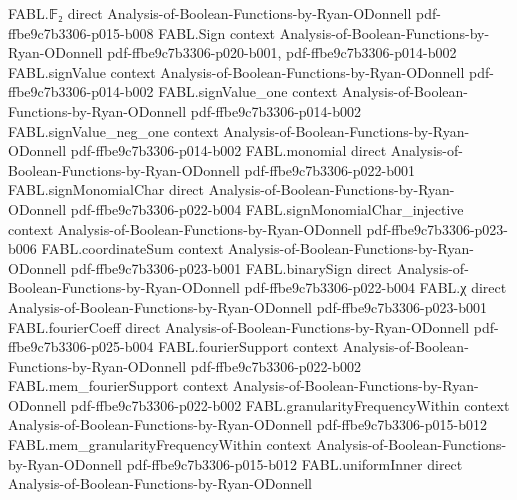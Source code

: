 \begin{theorem}
\leanok
{}
\proofstep
  {FABL.𝔽₂}
  {direct}
  {Analysis-of-Boolean-Functions-by-Ryan-ODonnell}
  {pdf-ffbe9c7b3306-p015-b008}
\proofstep
  {FABL.Sign}
  {context}
  {Analysis-of-Boolean-Functions-by-Ryan-ODonnell}
  {pdf-ffbe9c7b3306-p020-b001,
    pdf-ffbe9c7b3306-p014-b002}
\proofstep
  {FABL.signValue}
  {context}
  {Analysis-of-Boolean-Functions-by-Ryan-ODonnell}
  {pdf-ffbe9c7b3306-p014-b002}
\proofstep
  {FABL.signValue_one}
  {context}
  {Analysis-of-Boolean-Functions-by-Ryan-ODonnell}
  {pdf-ffbe9c7b3306-p014-b002}
\proofstep
  {FABL.signValue_neg_one}
  {context}
  {Analysis-of-Boolean-Functions-by-Ryan-ODonnell}
  {pdf-ffbe9c7b3306-p014-b002}
\proofstep
  {FABL.monomial}
  {direct}
  {Analysis-of-Boolean-Functions-by-Ryan-ODonnell}
  {pdf-ffbe9c7b3306-p022-b001}
\proofstep
  {FABL.signMonomialChar}
  {direct}
  {Analysis-of-Boolean-Functions-by-Ryan-ODonnell}
  {pdf-ffbe9c7b3306-p022-b004}
\proofstep
  {FABL.signMonomialChar_injective}
  {context}
  {Analysis-of-Boolean-Functions-by-Ryan-ODonnell}
  {pdf-ffbe9c7b3306-p023-b006}
\proofstep
  {FABL.coordinateSum}
  {context}
  {Analysis-of-Boolean-Functions-by-Ryan-ODonnell}
  {pdf-ffbe9c7b3306-p023-b001}
\proofstep
  {FABL.binarySign}
  {direct}
  {Analysis-of-Boolean-Functions-by-Ryan-ODonnell}
  {pdf-ffbe9c7b3306-p022-b004}
\proofstep
  {FABL.χ}
  {direct}
  {Analysis-of-Boolean-Functions-by-Ryan-ODonnell}
  {pdf-ffbe9c7b3306-p023-b001}
\proofstep
  {FABL.fourierCoeff}
  {direct}
  {Analysis-of-Boolean-Functions-by-Ryan-ODonnell}
  {pdf-ffbe9c7b3306-p025-b004}
\proofstep
  {FABL.fourierSupport}
  {context}
  {Analysis-of-Boolean-Functions-by-Ryan-ODonnell}
  {pdf-ffbe9c7b3306-p022-b002}
\proofstep
  {FABL.mem_fourierSupport}
  {context}
  {Analysis-of-Boolean-Functions-by-Ryan-ODonnell}
  {pdf-ffbe9c7b3306-p022-b002}
\proofstep
  {FABL.granularityFrequencyWithin}
  {context}
  {Analysis-of-Boolean-Functions-by-Ryan-ODonnell}
  {pdf-ffbe9c7b3306-p015-b012}
\proofstep
  {FABL.mem_granularityFrequencyWithin}
  {context}
  {Analysis-of-Boolean-Functions-by-Ryan-ODonnell}
  {pdf-ffbe9c7b3306-p015-b012}
\proofstep
  {FABL.uniformInner}
  {direct}
  {Analysis-of-Boolean-Functions-by-Ryan-ODonnell}

\end{theorem}
